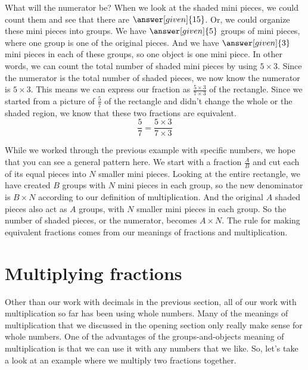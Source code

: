 \documentclass{ximera}
\begin{document}
\begin{example}
\begin{image}
\end{image}
What will the numerator be? When we look at the shaded mini pieces, we could count them and see that there are $\answer[given]{15}$. Or, we could organize these mini pieces into groups. We have $\answer[given]{5}$ groups of mini pieces, where one group is one of the original pieces. And we have $\answer[given]{3}$ mini pieces in each of these groups, so one object is one mini piece. In other words, we can count the total number of shaded mini pieces by using $5 \times 3$. Since the numerator is the total number of shaded pieces, we now know the numerator is $5 \times 3$. This means we can express our fraction as $\frac{5 \times 3}{7 \times 3}$ of the rectangle. Since we started from a picture of $\frac{5}{7}$ of the rectangle and didn't change the whole or the shaded region, we know that these two fractions are equivalent.
\[
\frac{5}{7} = \frac{5 \times 3}{7 \times 3}
\]

\end{example}

While we worked through the previous example with specific numbers, we hope that you can see a general pattern here. We start with a fraction $\frac{A}{B}$ and cut each of its equal pieces into $N$ smaller mini pieces. Looking at the entire rectangle, we have created $B$ groups with $N$ mini pieces in each group, so the new denominator is $B \times N$ according to our definition of multiplication. And the original $A$ shaded pieces also act as $A$ groups, with $N$ smaller mini pieces in each group. So the number of shaded pieces, or the numerator, becomes $A \times N$. The rule for making equivalent fractions comes from our meanings of fractions and multiplication.

\section{Multiplying fractions}

Other than our work with decimals in the previous section, all of our work with multiplication so far has been using whole numbers. Many of the meanings of multiplication that we discussed in the opening section only really make sense for whole numbers. One of the advantages of the groups-and-objects meaning of multiplication is that we can use it with any numbers that we like. So, let's take a look at an example where we multiply two fractions together. 
\end{document}
